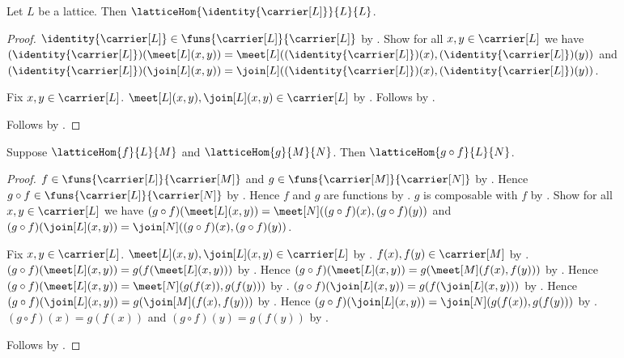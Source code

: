 \begin{proposition}\label{identity_lattice_hom}
    Let $L$ be a lattice.
    Then $\latticeHom{\identity{\carrier[L]}}{L}{L}$.
\end{proposition}
\begin{proof}
    $\identity{\carrier[L]}\in
        \funs{\carrier[L]}{\carrier[L]}$ by .
    Show for all $x,y\in\carrier[L]$ we have
        $(\identity{\carrier[L]})(\meet[L](x,y))
            =\meet[L]
                ((\identity{\carrier[L]})(x),
                 (\identity{\carrier[L]})(y))$ and
        $(\identity{\carrier[L]})(\join[L](x,y))
            =\join[L]
                ((\identity{\carrier[L]})(x),
                 (\identity{\carrier[L]})(y))$.
    \begin{subproof}
        Fix $x,y\in\carrier[L]$.
        $\meet[L](x,y),\join[L](x,y)\in\carrier[L]$ by
            .
        Follows by .
    \end{subproof}
    Follows by .
\end{proof}

\begin{theorem}\label{lattice_hom_composition}
    Suppose $\latticeHom{f}{L}{M}$ and $\latticeHom{g}{M}{N}$.
    Then $\latticeHom{g\circ f}{L}{N}$.
\end{theorem}
\begin{proof}
    $f\in\funs{\carrier[L]}{\carrier[M]}$ and
        $g\in\funs{\carrier[M]}{\carrier[N]}$ by
        .
    Hence $g\circ f\in
        \funs{\carrier[L]}{\carrier[N]}$ by .
    Hence $f$ and $g$ are functions by .
    $g$ is composable with $f$ by .
    Show for all $x,y\in\carrier[L]$ we have
        $(g\circ f)(\meet[L](x,y))
            =\meet[N]((g\circ f)(x),(g\circ f)(y))$ and
        $(g\circ f)(\join[L](x,y))
            =\join[N]((g\circ f)(x),(g\circ f)(y))$.
    \begin{subproof}
        Fix $x,y\in\carrier[L]$.
        $\meet[L](x,y),\join[L](x,y)\in\carrier[L]$ by
            .
        $f(x),f(y)\in\carrier[M]$ by
            .
        $(g\circ f)(\meet[L](x,y))
            =g(f(\meet[L](x,y)))$ by .
        Hence $(g\circ f)(\meet[L](x,y))
            =g(\meet[M](f(x),f(y)))$ by .
        Hence $(g\circ f)(\meet[L](x,y))
            =\meet[N](g(f(x)),g(f(y)))$ by .
        $(g\circ f)(\join[L](x,y))
            =g(f(\join[L](x,y)))$ by .
        Hence $(g\circ f)(\join[L](x,y))
            =g(\join[M](f(x),f(y)))$ by .
        Hence $(g\circ f)(\join[L](x,y))
            =\join[N](g(f(x)),g(f(y)))$ by .
        $(g\circ f)(x)=g(f(x))$ and $(g\circ f)(y)=g(f(y))$ by
            .
    \end{subproof}
    Follows by .
\end{proof}


